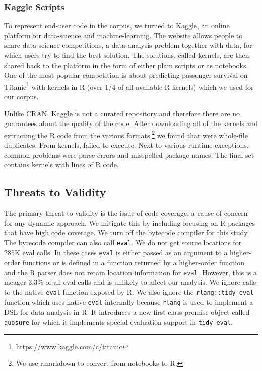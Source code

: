 \documentclass[USenglish,cleveref, autoref, thm-restate]{lipics-v2019}
\newcommand{\UndefinedEvalsRnd}{285K\xspace}
\newcommand{\PercentUndefinedEval}{3.3\%\xspace}
\newcommand{\eval}{\texttt{eval}\xspace}
\renewcommand{\c}[1]{\lstinline{#1}\xspace}
\begin{document}
\subsubsection{Kaggle Scripts}

To represent end-user code in the corpus, we turned to Kaggle, an online
platform for data-science and machine-learning. The website allows people to
share data-science competitions, a data-analysis problem together with data,
for which users try to find the best solution. The solutions, called
{kernels}, are then shared back to the platform in the form of either plain
scripts or as notebooks.  One of the most popular competition is about
predicting passenger survival on
Titanic\footnote{\url{https://www.kaggle.com/c/titanic}} with \CorpusKaggle
kernels in R (over 1/4 of all available R kernels) which we used for our
corpus.

Unlike CRAN, Kaggle is not a curated repository and therefore there are no
guarantees about the quality of the code. After downloading all of the
\CorpusKaggle kernels and extracting the R code from the various
formats,\footnote{We use {\sf rmarkdown} to convert from notebooks to R.} we
found that \CorpusDuplicatedKaggle were whole-file duplicates. From
\CorpusRunnableKaggle kernels, \CorpusFailedKaggle failed to execute. Next
to various runtime exceptions, common problems were parse errors and
misspelled package names.  The final set contains \CorpusFinishedKaggle
kernels with \CorpusFinishedKaggleCodeRnd lines of R code.

\subsection{Threats to Validity}
The primary threat to validity is the issue of
code coverage, a cause of concern for any dynamic approach. We mitigate this
by including focusing on R packages that have high code coverage. We turn
off the bytecode compiler for this study. The bytecode compiler can also
call \eval. We do not get source locations for \UndefinedEvalsRnd eval
calls. In these cases \eval is either passed as an argument to a
higher-order functions or is defined in a function returned by a
higher-order function and the R parser does not retain location information
for \eval. However, this is a meager \PercentUndefinedEval of all eval calls
and is unlikely to affect our analysis. We ignore calls to the native \eval
function exposed by R. We also ignore the \c{rlang::tidy_eval} function
which uses native \eval internally because \c{rlang} is used to implement a
DSL for data analysis in R. It introduces a new first-class promise object
called \c{quosure} for which it implements special evaluation support in
\c{tidy_eval}.
\end{document}
